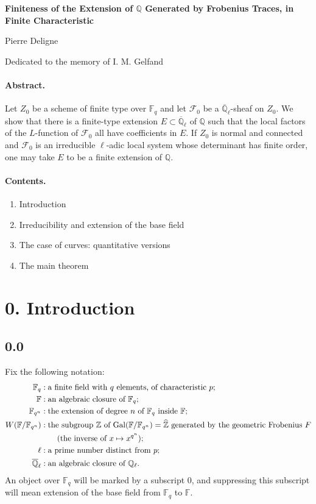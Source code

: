 \documentclass[11pt]{article}
\newcommand{\F}{\mathbb{F}}
\newcommand{\Q}{\mathbb{Q}}
\newcommand{\Z}{\mathbb{Z}}
\newcommand{\Ql}{\overline{\mathbb Q}_{\ell}}
\newcommand{\Gal}{\operatorname{Gal}}
\begin{document}
\begin{center}
{\Large\bfseries Finiteness of the Extension of $\Q$ Generated by Frobenius Traces, in Finite Characteristic}\par
\vspace{0.5em}
Pierre Deligne\par
\vspace{0.5em}
Dedicated to the memory of I. M. Gelfand
\end{center}

\paragraph{Abstract.}
Let $Z_0$ be a scheme of finite type over $\F_q$ and let $\mathcal F_0$ be a $\Ql$-sheaf on $Z_0$.
We show that there is a finite-type extension $E\subset \Ql$ of $\Q$ such that the local factors of the $L$-function of $\mathcal F_0$ all have coefficients in $E$.
If $Z_0$ is normal and connected and $\mathcal F_0$ is an irreducible $\ell$-adic local system whose determinant has finite order, one may take $E$ to be a finite extension of $\Q$.

\paragraph{Contents.}
\begin{enumerate}[label=\arabic*., start=0]
\item Introduction
\item Irreducibility and extension of the base field
\item The case of curves: quantitative versions
\item The main theorem
\end{enumerate}

\section*{0. Introduction}

\subsection*{0.0}
Fix the following notation:
\begin{align*}
\F_q&: \text{a finite field with $q$ elements, of characteristic $p$;}\\
\F&: \text{an algebraic closure of $\F_q$;}\\
\F_{q^n}&: \text{the extension of degree $n$ of $\F_q$ inside $\F$;}\\
W(\F/\F_{q^n})&: \text{the subgroup $\Z$ of $\Gal(\F/\F_{q^n})=\widehat{\Z}$ generated by the geometric Frobenius $F$}\\
&\qquad \text{(the inverse of $x\mapsto x^{q^n}$);}\notag\\
\ell&: \text{a prime number distinct from $p$;}\\
\Ql&: \text{an algebraic closure of $\mathbb Q_\ell$.}
\end{align*}
An object over $\F_q$ will be marked by a subscript $0$, and suppressing this subscript will mean extension of the base field from $\F_q$ to $\F$.
\end{document}
